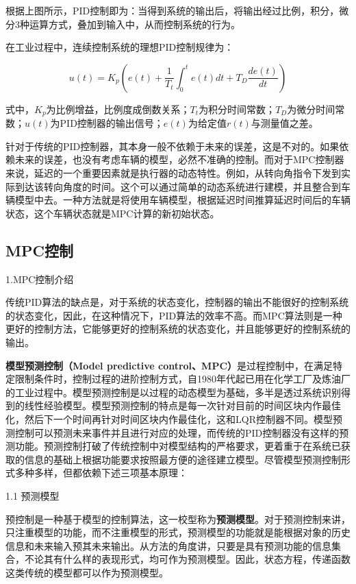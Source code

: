 根据上图所示，PID控制即为：当得到系统的输出后，将输出经过比例，积分，微分3种运算方式，叠加到输入中，从而控制系统的行为。

在工业过程中，连续控制系统的理想PID控制规律为：

\begin{equation}
u(t)=K_{p}\left(e(t)+\frac{1}{T_{t}} \int_{0}^{t} e(t) d t+T_{D} \frac{d e(t)}{d t}\right)
\end{equation}

式中，$K_{p}$为比例增益，比例度成倒数关系；$T_{t}$为积分时间常数；$T_{D}$为微分时间常数；$u(t)$为PID控制器的输出信号；$e(t)$为给定值$r(t)$与测量值之差。

针对于传统的PID控制器，其本身一般不依赖于未来的误差，这是不对的。如果依赖未来的误差，也没有考虑车辆的模型，必然不准确的控制。而对于MPC控制器来说，延迟的一个重要因素就是执行器的动态特性。例如，从转向角指令下发到实际到达该转向角度的时间。这个可以通过简单的动态系统进行建模，并且整合到车辆模型中去。一种方法就是将使用车辆模型，根据延迟时间推算延迟时间后的车辆状态，这个车辆状态就是MPC计算的新初始状态。\cite{ArtE10}

\subsection{MPC控制}

1.MPC控制介绍

传统PID算法的缺点是，对于系统的状态变化，控制器的输出不能很好的控制系统的状态变化，因此，在这种情况下，PID算法的效率不高。而MPC算法则是一种更好的控制方法，它能够更好的控制系统的状态变化，并且能够更好的控制系统的输出。

\textbf{模型预测控制（Model predictive control、MPC）}是过程控制中，在满足特定限制条件时，控制过程的进阶控制方式，自1980年代起已用在化学工厂及炼油厂的工业过程中。模型预测控制是以过程的动态模型为基础，多半是透过系统识别得到的线性经验模型。模型预测控制的特点是每一次针对目前的时间区块内作最佳化，然后下一个时间再针对时间区块内作最佳化，这和LQR控制器不同。模型预测控制可以预测未来事件并且进行对应的处理，而传统的PID控制器没有这样的预测功能。预测控制打破了传统控制中对模型结构的严格要求，更着重于在系统已获取的信息的基础上根据功能要求按照最方便的途径建立模型。尽管模型预测控制形式多种多样，但都依赖下述三项基本原理：

1.1 预测模型

预控制是一种基于模型的控制算法，这一校型称为\textbf{预测模型}\cite{Art3}。对于预测控制来讲，只注重模型的功能，而不注重模型的形式，预测模型的功能就是能根据对象的历史信息和未来输入预其未来输出。从方法的角度讲，只要是具有预测功能的信息集合，不论其有什么样的表现形式，均可作为预测模型。因此，状态方程，传递函数这类传统的模型都可以作为预测模型。

